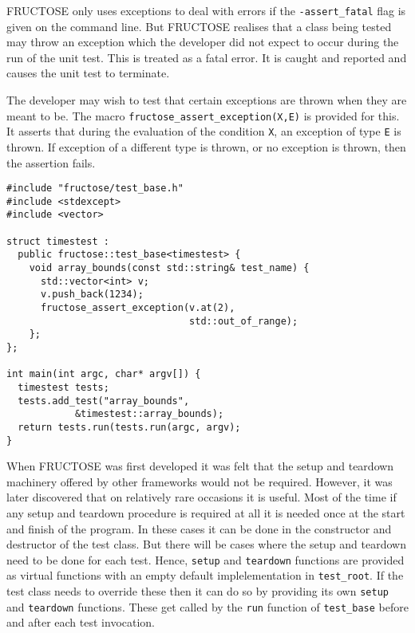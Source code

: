 \documentclass{book}
\begin{document}
FRUCTOSE only uses exceptions to deal with errors if the
{\tt -assert\_fatal} flag is given on the command line.
But FRUCTOSE realises that a class being tested may throw
an exception which the developer did not expect to occur
during the run of the unit test. This is treated as a
fatal error. It is caught and reported and causes the
unit test to terminate.

The developer may wish to test that certain exceptions are
thrown when they are meant to be. 
The macro {\tt fructose\_assert\_exception(X,E)}
is provided for this. It asserts that during the evaluation
of the condition {\tt X}, an exception of type {\tt E}
is thrown. If exception of a different type is thrown,
or no exception is thrown, then the assertion fails.

\begin{verbatim}
#include "fructose/test_base.h"
#include <stdexcept>
#include <vector>

struct timestest : 
  public fructose::test_base<timestest> {
    void array_bounds(const std::string& test_name) {
      std::vector<int> v;
      v.push_back(1234);
      fructose_assert_exception(v.at(2), 
                                std::out_of_range);
    };
};

int main(int argc, char* argv[]) {
  timestest tests;
  tests.add_test("array_bounds", 
            &timestest::array_bounds);
  return tests.run(tests.run(argc, argv);
}
\end{verbatim}


When FRUCTOSE was first developed it was felt that the setup and teardown
machinery offered by other frameworks would not be required.
However, it was later discovered that on relatively rare
occasions it is useful. Most of the time if any setup and teardown procedure
is required at all it is needed once at the start and finish of
the program. In these cases it can be done in the constructor and
destructor of the test class. But there will be cases where the setup
and teardown need to be done for each test.
Hence, {\tt setup} and {\tt teardown} functions are provided as virtual
functions with an empty default implelementation in {\tt test\_root}.
If the test class needs to override these then it can do so by providing
its own {\tt setup} and {\tt teardown} functions.
These get called by the {\tt run} function of {\tt test\_base} before
and after each test invocation.

\end{document}
